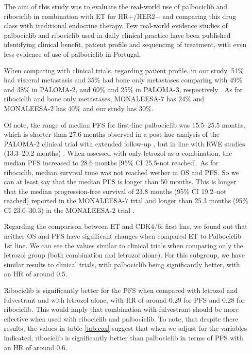 The aim of this study was to evaluate the real-world use of palbociclib and ribociclib in combination with ET for HR+/HER2$-$ and comparing this drug class with traditional endocrine therapy. Few real-world evidence studies of palbociclib and ribociclib used in daily clinical practice have been published identifying clinical benefit, patient profile and sequencing of treatment, with even less evidence of use of palbociclib in Portugal.

When comparing with clinical trials, regarding patient profile, in our study, 51\% had visceral metastasis and 35\% had bone only metastases comparing with 49\% and 38\% in PALOMA-2, and 60\% and 25\% in PALOMA-3, respectively \cite{rugoImpactPalbociclibLetrozole2018,cristofanilliFulvestrantPalbociclibFulvestrant2016a}.
As for ribociclib and bone only metastases, MONALEESA-7 \cite{tripathyRibociclibEndocrineTherapy2018} has 24\% and MONALEESA-2 has 40\% \cite{hortobagyiUpdatedResultsMONALEESA22018} and our study has 30\%.



Of note, the range of median PFS for first-line palbociclib was 15.5–25.5 months, which is shorter than 27.6 months observed in a post hoc analysis of the PALOMA-2 clinical trial with extended follow-up \cite{rugoImpactPalbociclibLetrozole2018}, but in line with RWE studies (13.3–20.2 months) \cite{harbeckCDK4InhibitorsHR2021}. When assessed with only letrozol as a combination, the median PFS increased to 28.6 months [95\% CI 25.5-not reached].
As for ribociclib, median survival time was not reached wether in OS and PFS. So we can at least say that the median PFS is longer than 50 months. This is longer that the median progression-free survival of 23.8 months (95\% CI 19.2–not reached) reported in the MONALEESA-7 trial \cite{tripathyRibociclibEndocrineTherapy2018} and longer than  25.3 months (95\% CI 23.0–30.3) in the MONALEESA-2 trial \cite{hortobagyiUpdatedResultsMONALEESA22018}. 

Regarding the comparison between ET and CDK4/6i first line, we found out that neither OS and PFS have significant changes when compared ET to Palbociclib 1st line. We can see the values similar to clinical trials when comparing only the letrozol group (both combination and letrozol alone). For this subgroup, we have similar results to clinical trials, with palbociclib being significantly better, with an HR of around 0.5.

Ribociclib is significantly better for the PFS when compared with letrozol and fulvestrant and with letrozol alone, with HR of around 0.29 for PFS and 0.28 for ribociclib.
This would imply that combination with fulvestrant should be more effective when used with ribociclib and palbociclib.
To note, that despite there results, the values in table \ref*{tab:cox} suggest that when we adjust for the variables indicated, ribociclib is significantly better than palbociclib in terms of PFS with an HR of around 0.6.

